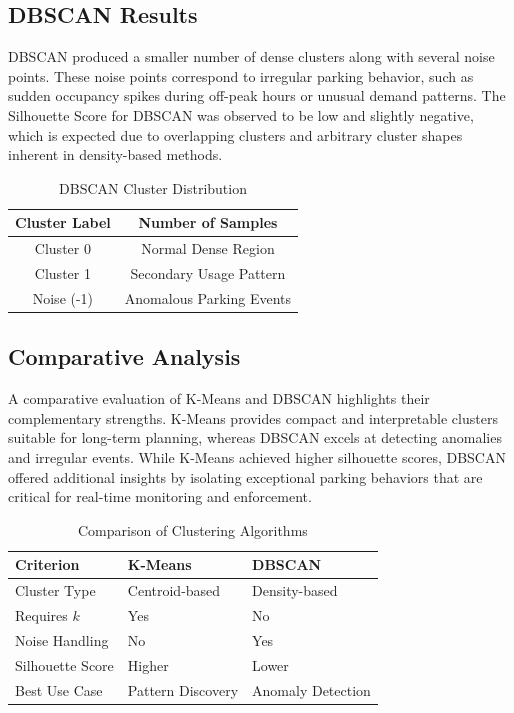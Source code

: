\documentclass[conference]{IEEEtran}
\begin{document}
\subsection{DBSCAN Results}

DBSCAN produced a smaller number of dense clusters along with several noise points. These noise points correspond to irregular parking behavior, such as sudden occupancy spikes during off-peak hours or unusual demand patterns. The Silhouette Score for DBSCAN was observed to be low and slightly negative, which is expected due to overlapping clusters and arbitrary cluster shapes inherent in density-based methods.

\begin{table}[htbp]
\caption{DBSCAN Cluster Distribution}
\centering
\begin{tabular}{cc}
\toprule
\textbf{Cluster Label} & \textbf{Number of Samples} \\
\midrule
Cluster 0 & Normal Dense Region \\
Cluster 1 & Secondary Usage Pattern \\
Noise (-1) & Anomalous Parking Events \\
\bottomrule
\end{tabular}
\label{tab:dbscan}
\end{table}

\subsection{Comparative Analysis}

A comparative evaluation of K-Means and DBSCAN highlights their complementary strengths. K-Means provides compact and interpretable clusters suitable for long-term planning, whereas DBSCAN excels at detecting anomalies and irregular events. While K-Means achieved higher silhouette scores, DBSCAN offered additional insights by isolating exceptional parking behaviors that are critical for real-time monitoring and enforcement.

\begin{table}[htbp]
\caption{Comparison of Clustering Algorithms}
\centering
\begin{tabular}{lll}
\toprule
\textbf{Criterion} & \textbf{K-Means} & \textbf{DBSCAN} \\
\midrule
Cluster Type & Centroid-based & Density-based \\
Requires $k$ & Yes & No \\
Noise Handling & No & Yes \\
Silhouette Score & Higher & Lower \\
Best Use Case & Pattern Discovery & Anomaly Detection \\
\bottomrule
\end{tabular}
\label{tab:comparison}
\end{table}
\end{document}
